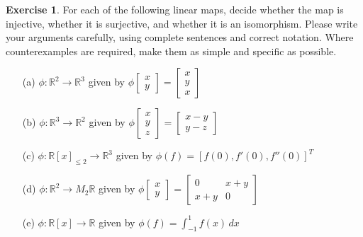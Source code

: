 \documentclass{amsart}
\newcommand{\R}         {{\mathbb{R}}}
\newcommand{\bsm}       {\left[\begin{smallmatrix}}
\newcommand{\esm}       {\end{smallmatrix}\right]}
\renewcommand{\:}       {\colon}
\theoremstyle{definition}
\newtheorem{exercise}{Exercise}[section]
\begin{document}
\begin{exercise}
 For each of the following linear maps, decide whether the
 map is injective, whether it is surjective, and whether it
 is an isomorphism.  Please write your arguments carefully,
 using complete sentences and correct notation.  Where
 counterexamples are required, make them as simple and
 specific as possible.
 \begin{itemize}
  \item[(a)] $\phi\:\R^2\to\R^3$ given by
   $\displaystyle \phi\bsm x\\ y\esm=\bsm x\\ y\\ x\esm$
  \item[(b)] $\phi\:\R^3\to\R^2$ given by
   $\displaystyle \phi\bsm x\\ y\\ z\esm=\bsm x-y\\ y-z\esm$
  \item[(c)] $\phi\:\R[x]_{\leq 2}\to\R^3$ given by
   $\phi(f)=[f(0),f'(0),f''(0)]^T$ 
  \item[(d)] $\phi\:\R^2\to M_2\R$ given by 
   $\displaystyle\phi\bsm x\\ y\esm=\bsm 0&x+y\\x+y&0\esm$
  \item[(e)] $\phi\:\R[x]\to\R$ given by $\phi(f)=\int_{-1}^1f(x)\,dx$
 \end{itemize}
\end{exercise}
\end{document}
